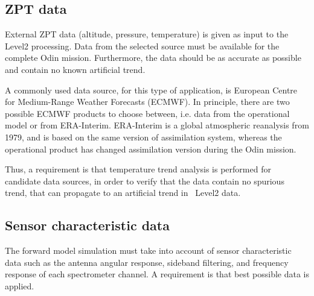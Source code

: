 \subsection{ZPT data}
External ZPT data (altitude, pressure, temperature) is given as input
to the Level2 processing. Data from the selected source must be available
for the complete Odin mission. Furthermore, the data should be as accurate
as possible %
and contain no known artificial trend. 

A commonly used data source, for this type of application, is 
European Centre for Medium-Range Weather Forecasts (ECMWF).
In principle, there are two possible ECMWF products to choose
between, i.e. data from the operational model or from   
ERA-Interim. ERA-Interim is a global atmospheric reanalysis from 1979,
and is based on the same version of assimilation system,
whereas the operational product has changed assimilation
version during the Odin mission. 
 
Thus, a requirement is that temperature trend analysis is performed 
for candidate data sources, in order to verify that the data contain
no spurious trend, that can propagate to an artificial trend in
\smr\ Level2 data.
 

\subsection{Sensor characteristic data}  
The forward model simulation must take into account of sensor characteristic data
such as the antenna angular response, sideband filtering, and frequency response 
of each spectrometer channel. A requirement is that best possible
data is applied. 



